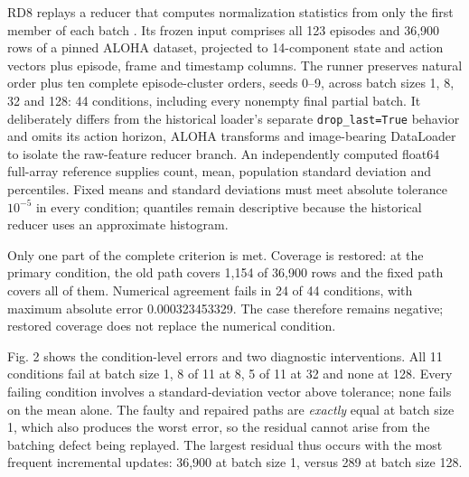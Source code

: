 \documentclass[conference]{IEEEtran}
\begin{document}
RD8 replays a reducer that computes normalization statistics from only the first member of each batch \cite{8}. Its frozen input comprises all 123 episodes and 36,900 rows of a pinned ALOHA dataset, projected to 14-component state and action vectors plus episode, frame and timestamp columns. The runner preserves natural order plus ten complete episode-cluster orders, seeds 0--9, across batch sizes 1, 8, 32 and 128: 44 conditions, including every nonempty final partial batch. It deliberately differs from the historical loader's separate \texttt{drop\_\allowbreak{}\allowbreak{}last=True} behavior and omits its action horizon, ALOHA transforms and image-bearing DataLoader to isolate the raw-feature reducer branch. An independently computed float64 full-array reference supplies count, mean, population standard deviation and percentiles. Fixed means and standard deviations must meet absolute tolerance \(10^{-5}\) in every condition; quantiles remain descriptive because the historical reducer uses an approximate histogram.\par



Only one part of the complete criterion is met. Coverage is restored: at the primary condition, the old path covers 1,154 of 36,900 rows and the fixed path covers all of them. Numerical agreement fails in 24 of 44 conditions, with maximum absolute error 0.000323453329. The case therefore remains negative; restored coverage does not replace the numerical condition.\par

Fig. 2 shows the condition-level errors and two diagnostic interventions. All 11 conditions fail at batch size 1, 8 of 11 at 8, 5 of 11 at 32 and none at 128. Every failing condition involves a standard-deviation vector above tolerance; none fails on the mean alone. The faulty and repaired paths are \textit{exactly} equal at batch size 1, which also produces the worst error, so the residual cannot arise from the batching defect being replayed. The largest residual thus occurs with the most frequent incremental updates: 36,900 at batch size 1, versus 289 at batch size 128.\par
\end{document}
